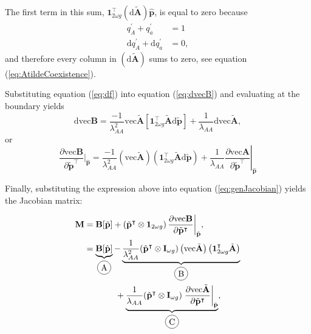 \documentclass[11pt]{article}
\newcommand*\circled[1]{\tikz[baseline=(char.base)]{
            \node[shape=circle,draw,inner sep=2pt] (char) {#1};}}
\def\mbf#1{\mathbf{#1}}
\begin{document}
\newpage

The first term in this sum, $\mbf{1}^{\intercal}_{2 \omega g} \left( \text{d} \tilde{\mbf{A}} \right) \hat{\mbf{p}}$, is equal to zero because
\begin{align*}
	q^{\prime}_A + q^{\prime}_a &= 1 \\
	\text{d}q^{\prime}_A + \text{d}q^{\prime}_a &= 0, 
\end{align*}
and therefore every column in $\left( \text{d} \tilde{\mbf{A}} \right)$ sums to zero, see equation (\ref{eq:AtildeCoexistence}).

Substituting equation (\ref{eq:df}) into equation (\ref{eq:dvecB}) and evaluating at the boundary yields
\begin{equation} \label{eq:dvecBsubs}
	\text{dvec} \mbf{B} = \frac{ -1 }{\lambda_{AA}^2 } \text{vec} \tilde{\mbf{A}} \left[ \mbf{1}^{\intercal}_{2 \omega g} \tilde{\mbf{A}} \text{d} \tilde{\mbf{p}} \right] + \frac{ 1 }{\lambda_{AA} } \text{dvec} \tilde{\mbf{A}},
\end{equation}
\noindent or 
\begin{equation}
	\frac{\partial \text{vec} \mbf{B}} {\partial \tilde{\mbf{p}}^{\intercal}} \bigg\rvert_{\hat{\mbf{p}}} = \frac{ -1 }{\lambda_{AA}^2 } \left( \text{vec} \tilde{\mbf{A}} \right) \left( \mbf{1}^{\intercal}_{2 \omega g} \tilde{\mbf{A}} \text{d} \tilde{\mbf{p}} \right) + \frac{ 1 }{\lambda_{AA} } \left. \frac{\partial \text{vec} \mbf{A}} {\partial \tilde{\mbf{p}}^{\intercal}} \right|_{\hat{\mbf{p}}}
\end{equation}

\noindent Finally, substituting the expression above into equation (\ref{eq:genJacobian}) yields the Jacobian matrix:

\begin{align*} \label{eq:subJacobian}
	\mbf{M} &=  \mbf{B}[\tilde{\mbf{p}}] + \left( \tilde{\mbf{p}}^{\intercal} \otimes \mbf{1}_{2 \omega g} \right) \frac{ \partial \text{vec}{\mbf{B}} }{ \partial \tilde{\mbf{p}}^{\intercal} } \bigg\rvert_{\hat{\mbf{p}}}, \\
			&= \underbrace{ \mbf{B}[\hat{\mbf{p}}]}_{\circled{A}} - 
			   \underbrace{ \frac{ 1 }{\lambda_{AA}^2 } (\hat{\mbf{p}}^{\intercal} \otimes \mbf{I}_{\omega g}) \left( \text{vec} \tilde{\mbf{A}} \right) \left( \mbf{1}^{\intercal}_{2 \omega g} \tilde{\mbf{A}} \right)}_{\circled{B}} \\
			&~~~~~~~~~~~+ \underbrace{\frac{ 1 }{\lambda_{AA} } (\hat{\mbf{p}}^{\intercal} \otimes \mbf{I}_{\omega g}) \left. \frac{\partial \text{vec} \tilde{\mbf{A}}}{\partial \tilde{\mbf{p}}^{\intercal}} \right|_{\hat{\mbf{p}}}}_{\circled{C}},
\end{align*}
\end{document}
